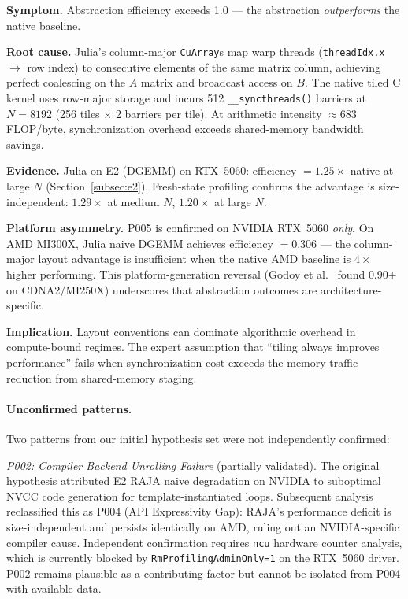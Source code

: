 \noindent\textbf{Symptom.}
Abstraction efficiency exceeds 1.0 --- the abstraction \emph{outperforms}
the native baseline.

\noindent\textbf{Root cause.}
Julia's column-major \texttt{CuArray}s map warp threads
(\texttt{threadIdx.x} $\rightarrow$ row index) to consecutive elements of the
same matrix column, achieving perfect coalescing on the $A$ matrix and
broadcast access on $B$. The native tiled C kernel uses row-major storage and
incurs 512 \texttt{\_\_syncthreads()} barriers at $N = 8192$ (256 tiles
$\times$ 2 barriers per tile). At arithmetic intensity $\approx 683$
FLOP/byte, synchronization overhead exceeds shared-memory bandwidth savings.

\noindent\textbf{Evidence.}
Julia on E2 (DGEMM) on RTX~5060: efficiency $= 1.25\times$ native at large
$N$ (Section~\ref{subsec:e2}). Fresh-state profiling confirms the advantage
is size-independent: $1.29\times$ at medium $N$, $1.20\times$ at large $N$.

\noindent\textbf{Platform asymmetry.}
P005 is confirmed on NVIDIA RTX~5060 \emph{only}. On AMD MI300X, Julia naive
DGEMM achieves efficiency $= 0.306$ --- the column-major layout advantage
is insufficient when the native AMD baseline is $4\times$ higher performing.
This platform-generation reversal (Godoy et al.~\cite{Godoy2023} found
$0.90$+ on CDNA2/MI250X) underscores that abstraction outcomes are
architecture-specific.

\noindent\textbf{Implication.}
Layout conventions can dominate algorithmic overhead in compute-bound regimes.
The expert assumption that ``tiling always improves performance'' fails when
synchronization cost exceeds the memory-traffic reduction from shared-memory
staging.

\label{subsec:unconfirmed}
\paragraph{Unconfirmed patterns.}
Two patterns from our initial hypothesis set were not independently confirmed:

\textit{P002: Compiler Backend Unrolling Failure} (partially validated).
The original hypothesis attributed E2 RAJA naive degradation on NVIDIA to
suboptimal NVCC code generation for template-instantiated loops. Subsequent
analysis reclassified this as P004 (API Expressivity Gap): RAJA's performance
deficit is size-independent and persists identically on AMD, ruling out an
NVIDIA-specific compiler cause. Independent confirmation requires
\texttt{ncu} hardware counter analysis, which is currently blocked by
\texttt{RmProfilingAdminOnly=1} on the RTX~5060 driver. P002 remains
plausible as a contributing factor but cannot be isolated from P004 with
available data.

